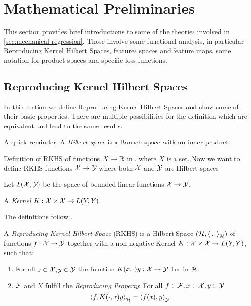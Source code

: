 \section{Mathematical Preliminaries}

This section provides brief introductions to some of the theories involved in \cref{sec:mechanical-regression}.
Those involve some functional analysis, in particular Reproducing Kernel Hilbert Spaces, features spaces and feature maps, some notation for product spaces and specific loss functions.

\subsection{Reproducing Kernel Hilbert Spaces}

In this section we define Reproducing Kernel Hilbert Spaces and show some of their basic properties.
There are multiple possibilities for the definition which are equivalent and lead to the same results.

A quick reminder: A \emph{Hilbert space} is a Banach space with an inner product.

Definition of RKHS of functions $X \rightarrow \mathbb{R}$ in \cite{sejdinovic12}, where $X$ is a set.
Now we want to define RKHS functions $\mathcal{X} \rightarrow \mathcal{Y}$ where both $\mathcal{X}$ and $\mathcal{Y}$ are Hilbert spaces

Let $L(\mathcal{X}, \mathcal{Y})$ be the space of bounded linear functions $\mathcal{X} \rightarrow \mathcal{Y}$.

\begin{definition}
	\label{def:kernel}
	A \emph{Kernel} $K: \mathcal{X} \times \mathcal{X} \rightarrow L(Y, Y)$
\end{definition}

The definitions follow \cite{kadri16}.
\begin{definition}
	\label{def:rkhs}
	A \emph{Reproducing Kernel Hilbert Space} (RKHS) is a Hilbert Space $(\mathcal{H}, \left<\cdot, \cdot\right>_{\mathcal{H}})$ of functions $f: \mathcal{X} \rightarrow \mathcal{Y}$ together with a non-negative Kernel $K: \mathcal{X} \times \mathcal{X} \rightarrow L(Y, Y)$, such that:
	\begin{enumerate}
		\item For all $x\in \mathcal{X}, y \in \mathcal{Y}$ the function $K(x, \cdot) y: \mathcal{X} \rightarrow \mathcal{Y}$ lies in $\mathcal{H}$.
		\item $\mathcal{F}$ and $K$ fulfill the \emph{Reproducing Property}: For all $f \in \mathcal{F}, x \in \mathcal{X}, y \in \mathcal{Y}$
		\begin{equation}
			\label{eq:reproducing-property}
			\left< f, K(\cdot, x) y \right>_{\mathcal{H}} = \left< f(x), y\right>_{\mathcal{Y}} \ .
		\end{equation}
	\end{enumerate}
\end{definition}


